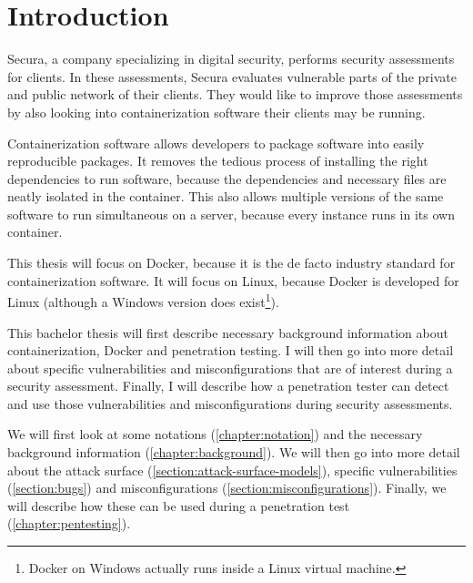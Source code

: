 \chapter{Introduction}
Secura, a company specializing in digital security, performs security assessments for clients. In these assessments, Secura evaluates vulnerable parts of the private and public network of their clients. They would like to improve those assessments by also looking into containerization software their clients may be running.

\hfill

Containerization software allows developers to package software into easily reproducible packages.
It removes the tedious process of installing the right dependencies to run software, because the dependencies and necessary files are neatly isolated in the container. This also allows multiple versions of the same software to run simultaneous on a server, because every instance runs in its own container.

\hfill

This thesis will focus on Docker, because it is the de facto industry standard for containerization software. It will focus on Linux, because Docker is developed for Linux (although a Windows version does exist\footnote{Docker on Windows actually runs inside a Linux virtual machine.}).

\hfill

This bachelor thesis will first describe necessary background information about containerization, Docker and penetration testing. I will then go into more detail about specific vulnerabilities and misconfigurations that are of interest during a security assessment. Finally, I will describe how a penetration tester can detect and use those vulnerabilities and misconfigurations during security assessments.

We will first look at some notations (\autoref{chapter:notation}) and the necessary background information (\autoref{chapter:background}). We will then go into more detail about the attack surface (\autoref{section:attack-surface-models}), specific vulnerabilities (\autoref{section:bugs}) and misconfigurations (\autoref{section:misconfigurations}). Finally, we will describe how these can be used during a penetration test (\autoref{chapter:pentesting}).
